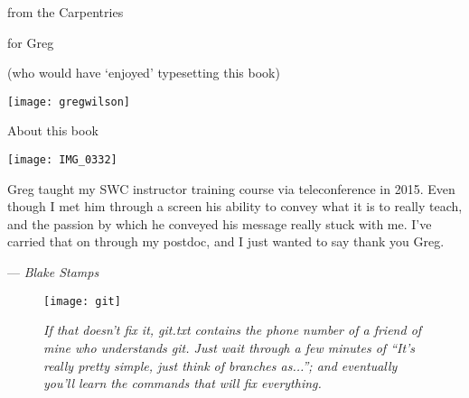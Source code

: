%
%
% 
%
\newcommand{\signed}[1]{\par\hfill\normalfont--- \textit{#1}}

\newpage

\vspace*{1in}
\begin{center}
{\Large from the Carpentries} 

{\LARGE for Greg}

{\large (who would have `enjoyed' typesetting this book)}

\vspace*{0.5in}

\texttt{[image: gregwilson]}
\end{center}
\newpage

\vspace*{1in}
{\LARGE About this book}


\newpage
\pagestyle{plain}
\texttt{[image: IMG\_0332]}

Greg taught my SWC instructor training course via teleconference in 2015. Even
though I met him through a screen his ability to convey what it is to really
teach, and the passion by which he conveyed his message really stuck with me.
I've carried that on through my postdoc, and I just wanted to say thank you
Greg.

\signed{Blake Stamps}

\newpage
\vspace*{\fill}

\begin{figure}[h!]
\begin{center}
\texttt{[image: git]}
\caption*{\textit{
If that doesn't fix it, git.txt contains the phone number of a friend
of mine who understands git. Just wait through a few minutes of
``It's really pretty simple, just think of branches as...''; and
eventually you'll learn the commands that will fix everything.}}
\end{center}
\end{figure}

